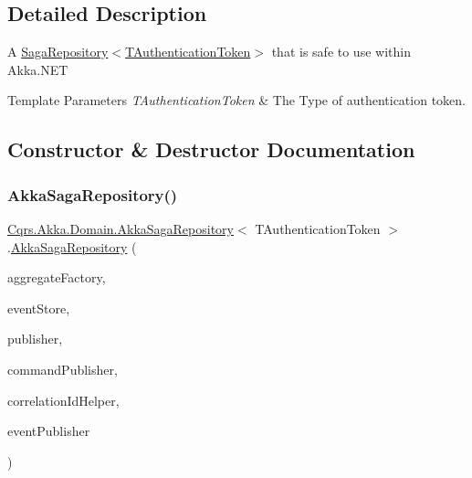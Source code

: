 \subsection{Detailed Description}
A \hyperlink{classCqrs_1_1Domain_1_1SagaRepository_ab444c7f3ace1ee0350d9f396345c395d_ab444c7f3ace1ee0350d9f396345c395d}{Saga\+Repository$<$\+T\+Authentication\+Token$>$} that is safe to use within Akka.\+N\+ET 


\begin{DoxyTemplParams}{Template Parameters}
{\em T\+Authentication\+Token} & The Type of authentication token.\\
\hline
\end{DoxyTemplParams}


\subsection{Constructor \& Destructor Documentation}
\mbox{\label{classCqrs_1_1Akka_1_1Domain_1_1AkkaSagaRepository_a69f3c0de994f3e966f6ee475482af5f5_a69f3c0de994f3e966f6ee475482af5f5}} 
\subsubsection{\texorpdfstring{Akka\+Saga\+Repository()}{AkkaSagaRepository()}}
{\footnotesize\ttfamily \hyperlink{classCqrs_1_1Akka_1_1Domain_1_1AkkaSagaRepository}{Cqrs.\+Akka.\+Domain.\+Akka\+Saga\+Repository}$<$ T\+Authentication\+Token $>$.\hyperlink{classCqrs_1_1Akka_1_1Domain_1_1AkkaSagaRepository}{Akka\+Saga\+Repository} (\begin{DoxyParamCaption}\item[{\hyperlink{interfaceCqrs_1_1Domain_1_1Factories_1_1IAggregateFactory}{I\+Aggregate\+Factory}}]{aggregate\+Factory,  }\item[{\hyperlink{interfaceCqrs_1_1Events_1_1IEventStore}{I\+Event\+Store}$<$ T\+Authentication\+Token $>$}]{event\+Store,  }\item[{\hyperlink{interfaceCqrs_1_1Events_1_1IEventPublisher}{I\+Event\+Publisher}$<$ T\+Authentication\+Token $>$}]{publisher,  }\item[{\hyperlink{interfaceCqrs_1_1Commands_1_1ICommandPublisher}{I\+Command\+Publisher}$<$ T\+Authentication\+Token $>$}]{command\+Publisher,  }\item[{I\+Correlation\+Id\+Helper}]{correlation\+Id\+Helper,  }\item[{\hyperlink{interfaceCqrs_1_1Akka_1_1Events_1_1IAkkaEventPublisherProxy}{I\+Akka\+Event\+Publisher\+Proxy}$<$ T\+Authentication\+Token $>$}]{event\+Publisher }\end{DoxyParamCaption})}



